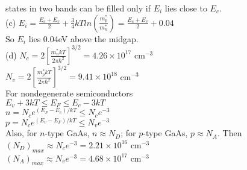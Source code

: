 \documentclass[11pt,oneside,a4paper]{article}
\begin{document}
\hspace{8.5mm} states in two bands can be filled only if \(E_i\) lies close to \(E_c\). \\

\quad (c) \(E_i=\frac{E_c+E_v}{2}+\frac{3}{4}kTln\left(\frac{m_p^*}{m_n^*}\right)=\frac{E_c+E_v}{2}+0.04\) \\

\hspace{8.5mm} So \(E_i\) lies 0.04eV above the midgap. \\

\quad (d) \(N_c=2\left[\frac{m_n^*kT}{2\pi\hbar^2}\right]^{3/2}=4.26\times10^{17}\) cm\(^{-3}\) \\

\hspace{8.5mm} \(N_v=2\left[\frac{m_p^*kT}{2\pi\hbar^2}\right]^{3/2}=9.41\times10^{18}\) cm\(^{-3}\) \\

\hspace{8.5mm} For nondegenerate semiconductors \\

\hspace{8.5mm} \(E_v+3kT\leq E_F\leq E_c-3kT\) \\

\hspace{8.5mm} \(n=N_ce^{(E_F-E_c)/kT}\leq N_ce^{-3}\) \\

\hspace{8.5mm} \(p=N_ce^{(E_v-E_F)/kT}\leq N_ve^{-3}\) \\

\hspace{8.5mm} Also, for \(n\)-type GaAs, \(n\approx N_D\); for \(p\)-type GaAs, \(p\approx N_A\). Then \\

\hspace{8.5mm} \((N_D)_{max}\approx N_ce^{-3}=2.21\times10^{16}\) cm\(^{-3}\) \\

\hspace{8.5mm} \((N_A)_{max}\approx N_ve^{-3}=4.68\times10^{17}\) cm\(^{-3}\) \\
\end{document}
